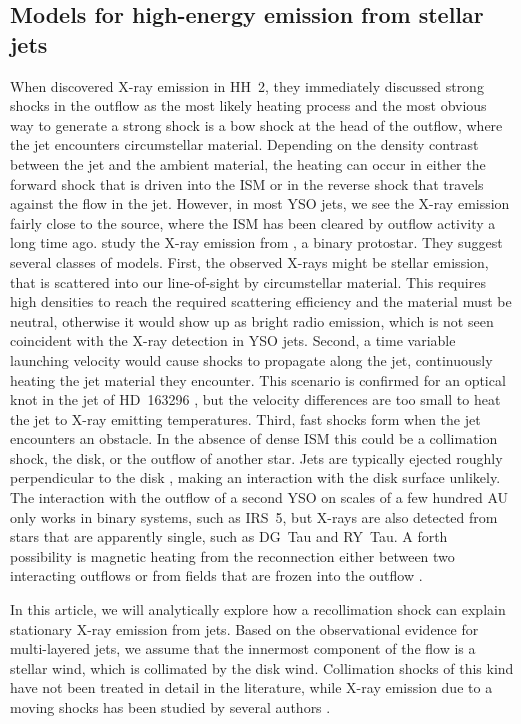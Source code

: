 \documentclass{emulateapj}
\begin{document}
\subsection{Models for high-energy emission from stellar jets}
\label{sect:intromodel}
When \citet{2001Natur.413..708P} discovered X-ray emission in HH~2, they immediately discussed strong shocks in the outflow as the most likely heating process and the most obvious way to generate a strong shock is a bow shock at the head of the outflow, where the jet encounters circumstellar material. Depending on the density contrast between the jet and the ambient material, the heating can occur in either the forward shock that is driven into the ISM or in the reverse shock that travels against the flow in the jet. However, in most YSO jets, we see the X-ray emission fairly close to the source, where the ISM has been cleared by outflow activity a long time ago. \citet{2003ApJ...584..843B} study the X-ray emission from , a binary protostar. They suggest several classes of models. First, the observed X-rays might be stellar emission, that is scattered into our line-of-sight by circumstellar material. This requires high densities to reach the required scattering efficiency and the material must be neutral, otherwise it would show up as bright radio emission, which is not seen coincident with the X-ray detection in YSO jets. Second, a time variable launching velocity would cause shocks to propagate along the jet, continuously heating the jet material they encounter. This scenario is confirmed for an optical knot in the jet of HD~163296 \citep{2013A&A...552A.142G}, but the velocity differences are too small to heat the jet to X-ray emitting temperatures. Third, fast shocks form when the jet encounters an obstacle. In the absence of dense ISM this could be a collimation shock, the disk, or the outflow of another star. Jets are typically ejected roughly perpendicular to the disk \citep[e.g.][for IRS 5]{2002A&A...382..573F}, making an interaction with the disk surface unlikely. The interaction with the outflow of a second YSO on scales of a few hundred AU only works in binary systems, such as IRS~5, but X-rays are also detected from stars that are apparently single, such as DG~Tau and RY~Tau. A forth possibility is magnetic heating from the reconnection either between two interacting outflows \citep{2008A&A...478..453M} or from fields that are frozen into the outflow \citep{2013A&A...550L...1S}.

In this article, we will analytically explore how a recollimation shock can explain stationary X-ray emission from jets. Based on the observational evidence for multi-layered jets, we assume that the innermost component of the flow is a stellar wind, which is collimated by the disk wind. Collimation shocks of this kind have not been treated in detail in the literature, while X-ray emission due to a moving shocks has been studied by several authors \citep[see, e.g.\ the analytical work and numerical simulations by][]{2002ApJ...576L.149R,2007A&A...462..645B,2010A&A...517A..68B}.
\end{document}

